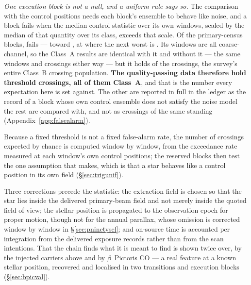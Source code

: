 \emph{One execution block is not a null, and a uniform rule says so.}
The comparison with the control positions needs each block's ensemble to behave
like noise, and a block fails when the median control statistic over its own
windows, scaled by the median of that quantity over its class, exceeds
\BqFactor{} that scale. Of the \BqNBlocks{} primary-census blocks, \BqNFail{}
fails --- \BqFailBlock{} toward \BqFailStar, at \BqFailQ{} where the next worst
is \BqNextQ. Its \BqFailNWin{} windows are all coarse-channel, so the Class~A
results are identical with it and without it --- the same \BqWinACut{}
windows and \BqXrossACut{} crossings either way --- but it holds
\BqFailNCross{} of the \NCross{} crossings, the survey's entire Class~B
crossing population. \textbf{The quality-passing data therefore hold
\EvNCrossQp{} threshold crossings, all of them Class~A}, and that is the
number every expectation here is set against. The other \BqFailNCross{} are
reported in full in the ledger as the record of a block whose own control
ensemble does not satisfy the noise model the rest are compared with, and not
as crossings of the same standing (Appendix~\ref{app:falsealarm}).

Because a fixed threshold is not a fixed false-alarm rate, the number of
crossings expected by chance is computed window by window, from the
exceedance rate measured at each window's own control positions; the reserved
blocks then test the one assumption that makes, which is that a star behaves
like a control position in its own field (\S\ref{sec:trigunif}).

Three corrections precede the statistic: the extraction field is chosen so
that the star lies inside the delivered primary-beam field and not merely
inside the quoted field of view; the stellar position is propagated to the
observation epoch for proper motion, though not for the annual parallax,
whose omission is corrected window by window in
\S\ref{sec:pninetysel}; and on-source time is accounted per integration
from the
delivered exposure records rather than from the scan intentions. That the
chain finds what it is meant to find is shown twice over, by the injected
carriers above and by $\beta$~Pictoris CO --- a real feature at a known
stellar position, recovered and localised in two transitions and
\NStageOneBpicEb{} execution blocks (\S\ref{sec:bpicval}).

